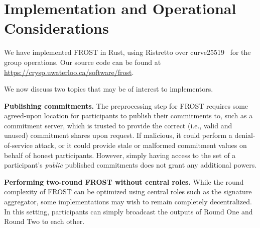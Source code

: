\section{Implementation and Operational Considerations}
\label{discussion}

We have implemented FROST in Rust, using Ristretto over
curve25519~\cite{ristretto} for the
group operations. Our source code can be found at
\url{https://crysp.uwaterloo.ca/software/frost}.

We now discuss two topics that may be of interest to implementors.

\textbf{Publishing commitments.} The preprocessing step for FROST requires some
agreed-upon location for participants to publish their commitments to, such as
a commitment server, which is trusted
to provide the correct (i.e., valid and unused) commitment shares upon request.
If malicious, it
could perform a denial-of-service attack, or it could provide stale or malformed commitment values on behalf of
honest participants.
However, simply having access to
the set of a participant's \emph{public} published commitments does not grant
any additional powers.

{\bf  Performing two-round FROST without central roles.}
While the round complexity of FROST can be optimized using central roles such as the signature
aggregator,
some implementations may wish to remain completely decentralized. In this
setting, participants can simply broadcast the outputs of Round One and Round Two to each other.

